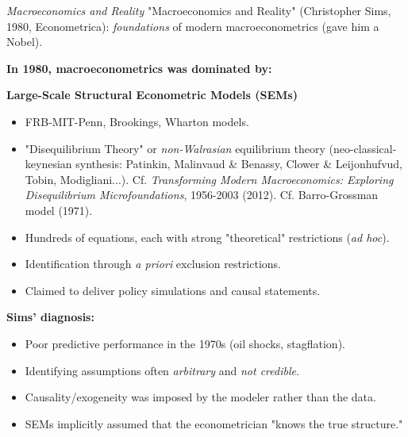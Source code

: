\documentclass{beamer}
\begin{document}
\begin{frame}{\textit{Macroeconomics and Reality }}
\footnotesize
"Macroeconomics and Reality" (Christopher Sims, 1980, Econometrica): \textit{foundations} of modern macroeconometrics (gave him a Nobel).

\smallskip
\textbf{In 1980, macroeconometrics was dominated by:}
\medskip

\textbf{Large-Scale Structural Econometric Models (SEMs)}
\begin{itemize}
    \item FRB-MIT-Penn, Brookings, Wharton models.
    \item "Disequilibrium Theory" or\textit{ non-Walrasian} equilibrium theory (neo-classical-keynesian synthesis: Patinkin, Malinvaud \& Benassy, Clower \& Leijonhufvud, Tobin, Modigliani...). Cf. \textit{Transforming Modern Macroeconomics: Exploring Disequilibrium Microfoundations}, 1956-2003 (2012). Cf. Barro-Grossman model (1971).
    \item Hundreds of equations, each with strong "theoretical" restrictions (\textit{ad hoc}).
    \item Identification through \emph{a priori} exclusion restrictions.
    \item Claimed to deliver policy simulations and causal statements.
\end{itemize}

\medskip
\textbf{Sims’ diagnosis:}
\begin{itemize}
    \item Poor predictive performance in the 1970s (oil shocks, stagflation).
    \item Identifying assumptions often \emph{arbitrary} and \emph{not credible}.
    \item Causality/exogeneity was imposed by the modeler rather than the data.
    \item SEMs implicitly assumed that the econometrician "knows the true structure."
\end{itemize}
\end{frame}
\end{document}
